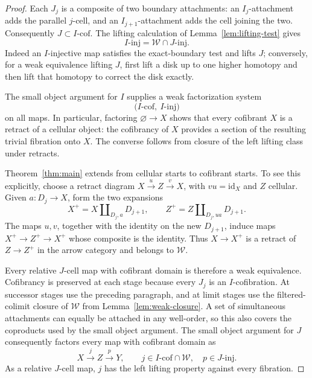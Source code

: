 \documentclass[11pt,letterpaper]{article}
\numberwithin{equation}{section}
\theoremstyle{plain}
\theoremstyle{definition}
\theoremstyle{remark}
\newcommand{\id}{\mathrm{id}}
\begin{document}
\begin{proof}
Each \(J_j\) is a composite of two boundary attachments: an
\(I_j\)-attachment adds the parallel \(j\)-cell, and an
\(I_{j+1}\)-attachment adds the cell joining the two.  Consequently
\(J\subset I\text{-}\mathrm{cof}\).  The lifting calculation of
Lemma~\ref{lem:lifting-test} gives
\begin{equation}\label{eq:consequences-trivial-fibrations}
 I\text{-}\mathrm{inj}
   =\mathcal W\cap J\text{-}\mathrm{inj}.
\end{equation}
Indeed an \(I\)-injective map satisfies the exact-boundary test and
lifts \(J\); conversely, for a weak equivalence lifting \(J\), first
lift a disk up to one higher homotopy and then lift that homotopy to
correct the disk exactly.

The small object argument for \(I\) supplies a weak factorization
system
\[
 \bigl(I\text{-}\mathrm{cof},\ I\text{-}\mathrm{inj}\bigr)
\]
on all maps.  In particular, factoring \(\varnothing\to X\) shows
that every cofibrant \(X\) is a retract of a cellular object: the
cofibrancy of \(X\) provides a section of the resulting trivial
fibration onto \(X\).  The converse follows from closure of the left
lifting class under retracts.

Theorem~\ref{thm:main} extends from cellular starts to cofibrant starts.
To see this explicitly, choose a retract diagram
\(X\xrightarrow{u}Z\xrightarrow{v}X\), with \(vu=\id_X\) and
\(Z\) cellular.  Given \(a:D_j\to X\), form the two expansions
\[
 X^+=X\amalg_{D_j,a}D_{j+1},
 \qquad
 Z^+=Z\amalg_{D_j,ua}D_{j+1}.
\]
The maps \(u,v\), together with the identity on the new
\(D_{j+1}\), induce maps \(X^+\to Z^+\to X^+\) whose composite
is the identity.  Thus \(X\to X^+\) is a retract of \(Z\to Z^+\)
in the arrow category and belongs to \(\mathcal W\).

Every relative \(J\)-cell map with cofibrant domain is therefore a
weak equivalence.  Cofibrancy is preserved at each stage because every
\(J_j\) is an \(I\)-cofibration.  At successor stages use the
preceding paragraph, and at limit stages use the filtered-colimit
closure of \(\mathcal W\) from Lemma~\ref{lem:weak-closure}.
A set of simultaneous attachments can equally be attached in any
well-order, so this also covers the coproducts used by the small object
argument.  The small object argument for \(J\) consequently factors
every map with cofibrant domain as
\[
 X\xrightarrow{j}Z\xrightarrow{p}Y,
 \qquad
 j\in I\text{-}\mathrm{cof}\cap\mathcal W,
 \quad p\in J\text{-}\mathrm{inj}.
\]
As a relative \(J\)-cell map, \(j\) has the left lifting property
against every fibration.


\end{proof}
\end{document}
